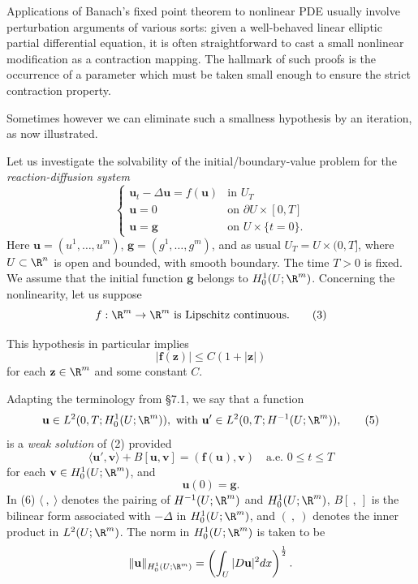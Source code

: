 Applications of Banach's fixed point theorem to nonlinear PDE usually involve perturbation arguments of various sorts: given a well-behaved linear elliptic partial differential equation, it is often straightforward to cast a small nonlinear modification as a contraction mapping. The hallmark of such proofs is the occurrence of a parameter which must be taken small enough to ensure the strict contraction property.

Sometimes however we can eliminate such a smallness hypothesis by an iteration, as now illustrated.

\begin{example}
\label{ex:reaction-diffusion-banach-fixed-point}
Let us investigate the solvability of the initial/boundary-value problem for the \textit{reaction-diffusion system}
\[
\begin{cases}
\mathbf{u}_t - \Delta \mathbf{u} = f(\mathbf{u}) & \text{in } U_T \\
\mathbf{u} = 0 & \text{on } \partial U \times [0,T] \\
\mathbf{u} = \mathbf{g} & \text{on } U \times \{t = 0\}.
\end{cases}
\tag{2}
\]
Here $\mathbf{u} = (u^1, \ldots, u^m)$, $\mathbf{g} = (g^1, \ldots, g^m)$, and as usual $U_T = U \times (0, T]$, where $U \subset \R^n$ is open and bounded, with smooth boundary. The time $T > 0$ is fixed. We assume that the initial function $\mathbf{g}$ belongs to $H^1_0(U; \R^m)$. Concerning the nonlinearity, let us suppose
\[
f : \R^m \to \R^m \text{ is Lipschitz continuous.}
\tag{3}
\]
\end{example}

This hypothesis in particular implies
\[
|\mathbf{f}(\mathbf{z})| \leq C(1 + |\mathbf{z}|)
\tag{4}
\]
for each $\mathbf{z} \in \R^m$ and some constant $C$.

Adapting the terminology from \S7.1, we say that a function
\[
\mathbf{u} \in L^2(0,T; H_0^1(U;\R^m)), \text{ with } \mathbf{u}' \in L^2(0,T; H^{-1}(U;\R^m)),
\tag{5}
\]
is a \textit{weak solution} of (2) provided
\[
\langle \mathbf{u}', \mathbf{v} \rangle + B[\mathbf{u},\mathbf{v}] = (\mathbf{f}(\mathbf{u}),\mathbf{v}) \quad \text{a.e. } 0 \le t \le T
\tag{6}
\]
for each $\mathbf{v} \in H_0^1(U;\R^m)$, and
\[
\mathbf{u}(0) = \mathbf{g}.
\tag{7}
\]
In (6) $\langle\ ,\ \rangle$ denotes the pairing of $H^{-1}(U;\R^m)$ and $H_0^1(U;\R^m)$, $B[\ ,\ ]$ is the bilinear form associated with $-\Delta$ in $H_0^1(U;\R^m)$, and $(\ ,\ )$ denotes the inner product in $L^2(U;\R^m)$. The norm in $H_0^1(U;\R^m)$ is taken to be
\[
\|\mathbf{u}\|_{H_0^1(U;\R^m)} = \left(\int_U |D\mathbf{u}|^2 dx\right)^{\frac12}.
\]


